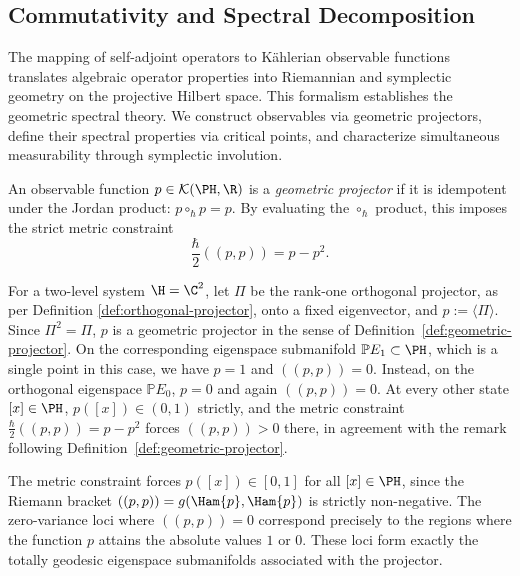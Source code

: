 \subsection*{Commutativity and Spectral Decomposition}
The mapping of self-adjoint operators to Kählerian observable functions translates algebraic operator properties into Riemannian and symplectic geometry on the projective Hilbert space. This formalism establishes the geometric spectral theory. We construct observables via geometric projectors, define their spectral properties via critical points, and characterize simultaneous measurability through symplectic involution.

\begin{definition}
	\label{def:geometric-projector}
	An observable function $p \in \mathcal{K}(\PH, \R)$ is a \emph{geometric projector} if it is idempotent under the Jordan product: $p \circ_{\hbar} p = p$. By evaluating the $\circ_{\hbar}$ product, this imposes the strict metric constraint
	\begin{equation}
		\frac{\hbar}{2}((p,p)) = p - p^2.
	\end{equation}
\end{definition}

\begin{example}
	For a two-level system $\H=\C^2$, let $\Pi$ be the rank-one orthogonal
	projector, as per Definition \ref{def:orthogonal-projector}, onto a fixed eigenvector, and $p:=\langle\Pi\rangle$. Since
	$\Pi^2=\Pi$, $p$ is a geometric projector in the sense of Definition~\ref{def:geometric-projector}. On the corresponding eigenspace submanifold $\mathbb{P}E_1\subset\PH$, which is a single point in this case, we have $p=1$ and $((p,p))=0$. Instead, on the orthogonal eigenspace $\mathbb{P}E_0$, $p=0$ and again $((p,p))=0$. At every other state $[x]\in\PH$, $p([x])\in(0,1)$ strictly, and the metric constraint $\tfrac{\hbar}{2}((p,p))=p-p^2$ forces $((p,p))>0$ there, in agreement with the remark following Definition~\ref{def:geometric-projector}.
\end{example}

\begin{remark}
	The metric constraint forces $p([x]) \in [0,1]$ for all $[x] \in \PH$, since the Riemann bracket $((p,p)) = g(\Ham{p}, \Ham{p})$ is strictly non-negative. The zero-variance loci where $((p,p)) = 0$ correspond precisely to the regions where the function $p$ attains the absolute values $1$ or $0$. These loci form exactly the totally geodesic eigenspace submanifolds associated with the projector.
\end{remark}

